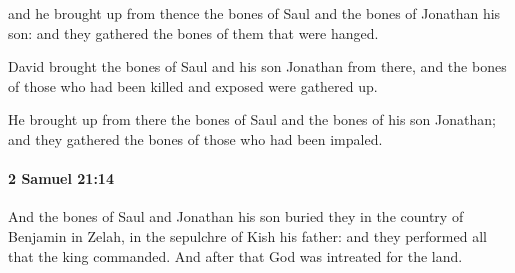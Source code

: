 			\begin{versebox}
					\item[BHS] 
					\item[ASV] and he brought up from thence the bones of Saul and the bones of Jonathan his son: and they gathered the bones of them that were hanged.
					\item[NIV] David brought the bones of Saul and his son Jonathan from there, and the bones of those who had been killed and exposed were gathered up.
					\item[NRSV] He brought up from there the bones of Saul and the bones of his son Jonathan; and they gathered the bones of those who had been impaled.
			\end{versebox}

		\paragraph{2 Samuel 21:14} %
			\label{2SAMUEL-21-14}

			And the bones of Saul and Jonathan his son buried they in the country of Benjamin in Zelah, in the sepulchre of Kish his father: and they performed all that the king commanded. And after that God was intreated for the land.

